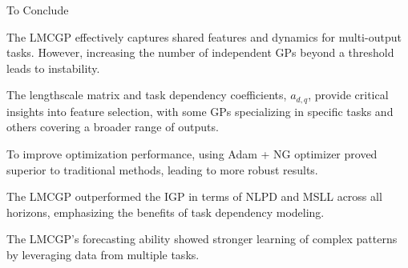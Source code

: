 \begin{frame}{To Conclude}
		\justifying
		\begin{block}{}
			\justifying
		The LMCGP effectively captures shared features and dynamics for multi-output tasks. However, increasing the number of independent GPs beyond a threshold leads to instability.
		\end{block}
		
		\begin{block}{}
			\justifying
		The lengthscale matrix and task dependency coefficients, $a_{d,q}$, provide critical insights into feature selection, with some GPs specializing in specific tasks and others covering a broader range of outputs.
		\end{block}
		
		\begin{block}{}
			\justifying
		To improve optimization performance, using Adam + NG optimizer proved superior to traditional methods, leading to more robust results.
		\end{block}
		
		\begin{block}{}
			\justifying
		The LMCGP outperformed the IGP in terms of NLPD and MSLL across all horizons, emphasizing the benefits of task dependency modeling.
		\end{block}
		
		\begin{block}{}
			\justifying
		The LMCGP's forecasting ability showed stronger learning of complex patterns by leveraging data from multiple tasks.
		\end{block}
\end{frame}
